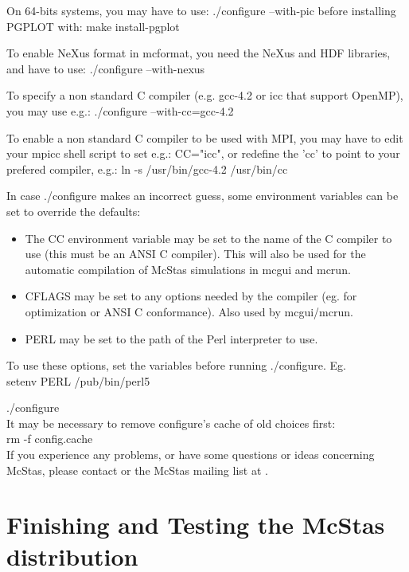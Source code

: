 \noindent On 64-bits systems, you may have to use: ./configure --with-pic before installing PGPLOT with: make install-pgplot

\noindent To enable NeXus format in mcformat, you need the NeXus and HDF libraries, and have to use: ./configure --with-nexus

\noindent To specify a non standard C compiler (e.g. gcc-4.2 or icc that support OpenMP), you may use e.g.: ./configure --with-cc=gcc-4.2

\noindent To enable a non standard C compiler to be used with MPI, you may have to edit your mpicc shell script to set e.g.: CC="icc", or redefine the 'cc' to point to your prefered compiler, e.g.: ln -s /usr/bin/gcc-4.2 /usr/bin/cc

In case ./configure makes an incorrect guess, some environment variables
can be set to override the defaults:
\begin{itemize}
\item{The CC environment variable may be set to the name of the C compiler
   to use (this must be an ANSI C compiler). This will also be used for
   the automatic compilation of McStas simulations in mcgui and
   mcrun.}
\item{CFLAGS may be set to any options needed by the compiler (eg. for
   optimization or ANSI C conformance). Also used by mcgui/mcrun.}
\item{PERL may be set to the path of the Perl interpreter to use.}
\end{itemize}
\noindent To use these options, set the variables before running ./configure. Eg.\\

    setenv PERL /pub/bin/perl5

    ./configure\\

\noindent It may be necessary to remove configure's cache of old
choices first:\\


    rm -f config.cache\\


\noindent If you experience any problems, or have some questions or ideas
concerning McStas, please contact
or the McStas mailing list at .

\section{Finishing and Testing the McStas distribution}
\label{s:testing}

